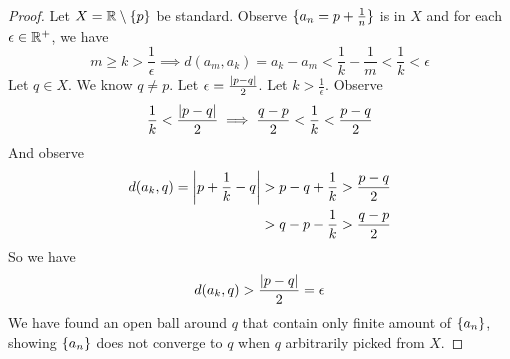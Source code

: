 \documentclass{report}
\begin{document}
\begin{proof}
Let $X=\mathbb{R} \setminus \{ p \}$ be standard. Observe $\{ a_n=p+\frac{1}{n} \}$ is in $X$ and for each $\epsilon \in\mathbb{R}^+$, we have
\begin{equation}
m\geq k>\frac{1}{\epsilon } \implies d(a_m,a_k)= a_k-a_m<\frac{1}{k}-\frac{1}{m}<\frac{1}{k}<\epsilon 
\end{equation}
Let $q\in X$. We know $q\neq p$. Let $\epsilon =\frac{\left|p-q\right|}{2}$. Let $k>\frac{1}{\epsilon }$. Observe
\begin{equation}
\frac{1}{k}<\frac{\left|p-q\right|}{2}\implies \frac{q-p}{2}<\frac{1}{k}<\frac{p-q}{2}
\end{equation}
And observe
\begin{align}
  d(a_k,q)=\left|p+\frac{1}{k}-q\right|&>p-q+\frac{1}{k}>\frac{p-q}{2}\\
  &>q-p-\frac{1}{k}>\frac{q-p}{2}
\end{align}
So we have
\begin{equation}
d(a_k,q)>\frac{\left|p-q\right|}{2}=\epsilon 
\end{equation}
We have found an open ball around $q$ that contain only finite amount of  $\{ a_n \}$, showing $\{ a_n \}$ does not converge to $q$ when $q$ arbitrarily picked from  $X$.

\end{proof}
\end{document}
